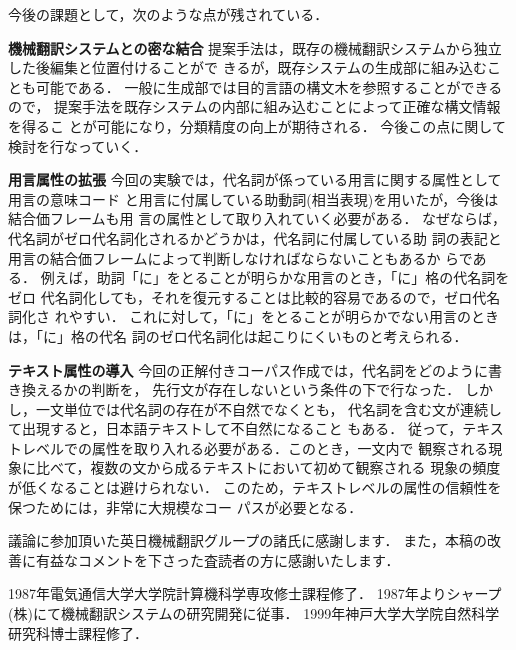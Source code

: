 今後の課題として，次のような点が残されている．
\begin{LIST}
\item[\bf 機械翻訳システムとの密な結合]
提案手法は，既存の機械翻訳システムから独立した後編集と位置付けることがで
きるが，既存システムの生成部に組み込むことも可能である．
一般に生成部では目的言語の構文木を参照することができるので，
提案手法を既存システムの内部に組み込むことによって正確な構文情報を得るこ
とが可能になり，分類精度の向上が期待される．
今後この点に関して検討を行なっていく．
\item[\bf 用言属性の拡張]
今回の実験では，代名詞が係っている用言に関する属性として用言の意味コード
と用言に付属している助動詞(相当表現)を用いたが，今後は結合価フレームも用
言の属性として取り入れていく必要がある．
なぜならば，代名詞がゼロ代名詞化されるかどうかは，代名詞に付属している助
詞の表記と用言の結合価フレームによって判断しなければならないこともあるか
らである．
例えば，助詞「に」をとることが明らかな用言のとき，「に」格の代名詞をゼロ
代名詞化しても，それを復元することは比較的容易であるので，ゼロ代名詞化さ
れやすい．
これに対して，「に」をとることが明らかでない用言のときは，「に」格の代名
詞のゼロ代名詞化は起こりにくいものと考えられる．
\item[\bf テキスト属性の導入]
今回の正解付きコーパス作成では，代名詞をどのように書き換えるかの判断を，
先行文が存在しないという条件の下で行なった．
しかし，一文単位では代名詞の存在が不自然でなくとも，
代名詞を含む文が連続して出現すると，日本語テキストして不自然になること
もある．
従って，テキストレベルでの属性を取り入れる必要がある．このとき，一文内で
観察される現象に比べて，複数の文から成るテキストにおいて初めて観察される
現象の頻度が低くなることは避けられない．
このため，テキストレベルの属性の信頼性を保つためには，非常に大規模なコー
パスが必要となる．
\end{LIST}

\acknowledgment

議論に参加頂いた英日機械翻訳グループの諸氏に感謝します．
また，本稿の改善に有益なコメントを下さった査読者の方に感謝いたします．

\vspace{6pt}




\clearpage

\begin{biography}
{1987年電気通信大学大学院計算機科学専攻修士課程修了．
1987年よりシャープ(株)にて機械翻訳システムの研究開発に従事．
1999年神戸大学大学院自然科学研究科博士課程修了．}

\end{biography}


